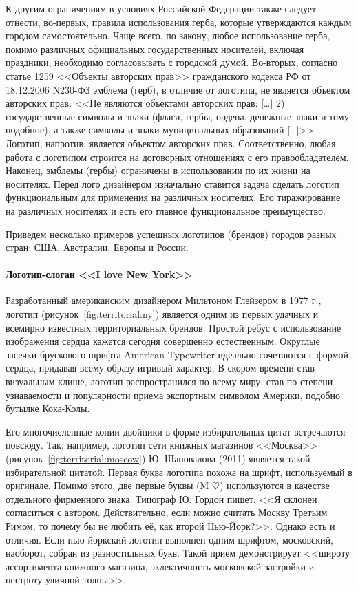 К другим ограничениям в условиях Российской Федерации также следует отнести, во-первых, правила
использования герба, которые утверждаются каждым городом самостоятельно. Чаще всего, по закону,
любое использование герба, помимо различных официальных государственных носителей, включая
праздники, необходимо согласовывать с городской думой.  Во-вторых, согласно статье 1259 <<Объекты
авторских прав>> гражданского кодекса РФ от 18.12.2006 N230-ФЗ  эмблема (герб), в отличие от
логотипа, не является объектом авторских прав: <<Не являются объектами авторских прав: [\ldots] 2)
государственные символы и знаки (флаги, гербы, ордена, денежные знаки и тому подобное), а также
символы и знаки муниципальных образований [\ldots]>> Логотип,
напротив, является объектом авторских прав. Соответственно, любая работа с логотипом строится на
договорных отношениях с его правообладателем. Наконец, эмблемы (гербы) ограничены в использовании по
их жизни на носителях. Перед лого дизайнером изначально ставится задача сделать логотип
функциональным для применения на различных носителях. Его тиражирование на различных носителях и
есть его главное функциональное преимущество.

Приведем несколько примеров успешных логотипов (брендов) городов разных стран: США, Австралии,
Европы и России.

\paragraph{Логотип-слоган <<I love New York>>}

Разработанный американским дизайнером Мильтоном Глейзером в 1977 г., логотип
(рисунок~\ref{fig:territorial:ny}) является одним из первых удачных и всемирно известных
территориальных брендов. Простой ребус с использование изображения сердца кажется сегодня совершенно
естественным. Округлые засечки брускового шрифта American Typewriter идеально сочетаются с формой
сердца, придавая всему образу игривый характер. В скором времени став визуальным клише, логотип
распространился по всему миру, став по степени узнаваемости и популярности приема экспортным
символом Америки, подобно бутылке Кока-Колы.

Его многочисленные копии-двойники в форме избирательных цитат встречаются повсюду. Так, например,
логотип сети книжных магазинов <<Москва>> (рисунок~\ref{fig:territorial:moscow}) Ю. Шаповалова (2011)
является такой избирательной цитатой. Первая буква логотипа похожа на шрифт, используемый в
оригинале. Помимо этого, две первые буквы (M $\heartsuit$) используются в качестве отдельного
фирменного знака. Типограф Ю. Гордон пишет: <<Я склонен согласиться с автором. Действительно, если
можно считать Москву Третьим Римом, то почему бы не любить её, как второй Нью-Йорк?>>.
\autocite[][347]{book:gordon} Однако есть и отличия. Если нью-йоркский логотип выполнен одним
шрифтом, московский, наоборот, собран из разностильных букв. Такой приём демонстрирует <<широту
ассортимента книжного магазина, эклектичность московской застройки и пестроту уличной толпы>>.
\autocite[][347]{book:gordon}

